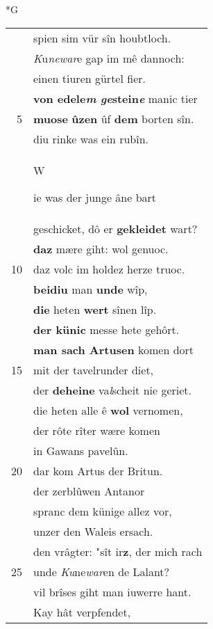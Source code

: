 \documentclass[8pt,a4paper,notitlepage]{article}
\begin{document}
\begin{table}[ht]
\begin{minipage}[t]{0.5\linewidth}
\small
\begin{center}*G
\end{center}
\begin{tabular}{rl}
 & spien sim vür sîn houbtloch.\\ 
 & \textit{K}u\textit{newar}e gap im mê dannoch:\\ 
 & einen tiuren gürtel fier.\\ 
 & \textbf{von edele\textit{m} \textit{ge}stein\textit{e}} manic tier\\ 
5 & \textbf{muose} \textbf{ûzen} ûf \textbf{dem} borten sîn.\\ 
 & diu rinke was ein rubîn.\\ 
 & \begin{large}W\end{large}ie was der junge âne bart\\ 
 & geschicket, dô er \textbf{gekleidet} wart?\\ 
 & \textbf{daz} mære giht: wol genuoc.\\ 
10 & daz volc im holdez herze truoc.\\ 
 & \textbf{beidiu} man \textbf{unde} wîp,\\ 
 & \textbf{die} heten \textbf{wert} sînen lîp.\\ 
 & \textbf{der künic} messe hete gehôrt.\\ 
 & \textbf{man sach Artusen} komen dort\\ 
15 & mit der tavelrunder diet,\\ 
 & der \textbf{deheine} va\textit{l}scheit nie geriet.\\ 
 & die heten alle ê \textbf{wol} vernomen,\\ 
 & der rôte rîter wære komen\\ 
 & in Gawans pavelûn.\\ 
20 & dar kom Artus der Britun.\\ 
 & der zerblûwen Antanor\\ 
 & spranc dem künige allez vor,\\ 
 & unzer den Waleis ersach.\\ 
 & den vrâgter: "sît ir\textbf{z}, der mich rach\\ 
25 & unde \textit{Ku}ne\textit{war}en de Lalant?\\ 
 & vil brîses giht man iuwerre hant.\\ 
 & Kay hât verpfendet,\\ 

\end{tabular}
\end{minipage}
\end{table}
\end{document}
